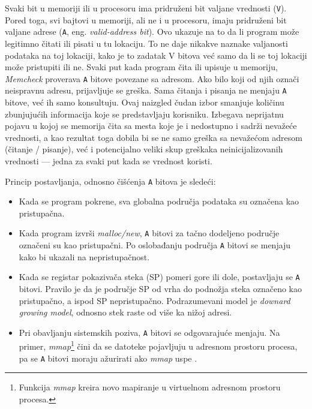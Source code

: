 \documentclass[12pt,oneside]{memoir}
\theoremstyle{plain}
\theoremstyle{definition}
\begin{document}
Svaki bit u memoriji ili u procesoru ima pridruženi bit valjane vrednosti (\texttt{V}). Pored toga, svi bajtovi u memoriji, ali ne i u procesoru, imaju pridruženi bit valjane adrese (\texttt{A}, eng. \textit{valid-address bit}). Ovo ukazuje na to da li program može legitimno čitati ili pisati u tu lokaciju. To ne daje nikakve naznake valjanosti podataka na toj lokaciji, kako je to zadatak V bitova već samo da li se toj lokaciji može pristupiti ili ne. Svaki put kada program čita ili upisuje u memoriju, \textit{Memcheck} proverava \texttt{A} bitove povezane sa adresom. Ako bilo koji od njih označi neispravnu adresu, prijavljuje se greška. Sama čitanja i pisanja ne menjaju \texttt{A} bitove, već ih samo konsultuju. Ovaj naizgled čudan izbor smanjuje količinu zbunjujućih informacija koje se predstavljaju korisniku. Izbegava neprijatnu pojavu u kojoj se memorija čita sa mesta koje je i nedostupno i sadrži nevažeće vrednosti, a kao rezultat toga dobila bi se ne samo greška sa nevažećom adresom (čitanje / pisanje), već i potencijalno veliki skup greškaka neinicijalizovanih vrednosti --- jedna za svaki put kada se vrednost koristi.

Princip postavljanja, odnosno čišćenja \texttt{A} bitova je sledeći:
\begin{itemize}
\item Kada se program pokrene, sva globalna područja podataka su označena kao pristupačna.
\item Kada program izvrši \textit{malloc/new}, \texttt{A} bitovi za tačno dodeljeno područje označeni su kao pristupačni. Po oslobađanju područja \texttt{A} bitovi se menjaju kako bi ukazali na nepristupačnost.
\item Kada se registar pokazivača steka (SP) pomeri gore ili dole, postavljaju se \texttt{A} bitovi. Pravilo je da je područje SP od vrha do podnožja steka označeno kao pristupačno, a ispod SP nepristupačno. Podrazumevani model je \textit{downard growing model}, odnosno stek raste od više ka nižoj adresi.
\item Pri obavljanju sistemskih poziva, \texttt{A} bitovi se odgovarajuće menjaju. Na primer, \textit{mmap}\footnote{Funkcija \textit{mmap} kreira novo mapiranje u virtuelnom adresnom prostoru procesa.} čini da se datoteke pojavljuju u adresnom prostoru procesa, pa se \texttt{A} bitovi moraju ažurirati ako \textit{mmap} uspe \cite{Memcheck}. 
\end{itemize}
\end{document}
